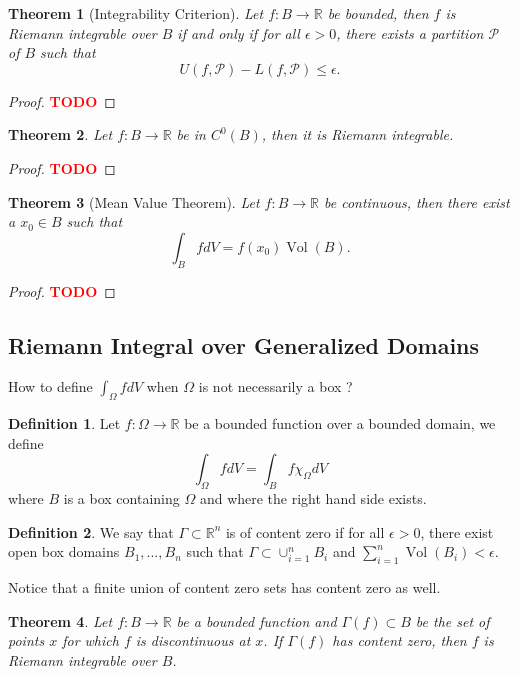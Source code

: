 \documentclass{article}
\theoremstyle{plain}
\newtheorem{theorem}{Theorem}[subsection]
\theoremstyle{definition}
\newtheorem*{definition}{Definition}
\newcommand{\R}{\mathbb{R}}
\renewcommand{\P}{\mathcal{P}}
\DeclareMathOperator{\Vol}{Vol}
\newcommand{\td}{\textcolor{red}{\textbf{TODO}}}
\begin{document}
\begin{theorem}[Integrability Criterion]
    Let $f : B \to \R$ be bounded, then $f$ is Riemann integrable over $B$ if and only if for all $\epsilon > 0$, there exists a partition $\P$ of $B$ such that
    $$U(f, \P) - L(f, \P) \leq \epsilon.$$
\end{theorem}

\begin{proof}
    \td 
\end{proof}

\begin{theorem}
    Let $f : B \to \R$ be in $C^0(B)$, then it is Riemann integrable.
\end{theorem}

\begin{proof}
    \td 
\end{proof}

\begin{theorem}[Mean Value Theorem]
    Let $f : B \to \R$ be continuous, then there exist a $x_0 \in B$ such that
    $$\int_B f dV = f(x_0) \Vol(B).$$
\end{theorem}

\begin{proof}
    \td 
\end{proof}

\subsection{Riemann Integral over Generalized Domains}

How to define $\int_{\Omega}fdV$ when $\Omega$ is not necessarily a box ?

\begin{definition}
    Let $f : \Omega \to \R$ be a bounded function over a bounded domain, we define
    $$\int_{\Omega} f dV = \int_{B} f \chi_{\Omega} dV$$
    where $B$ is a box containing $\Omega$ and where the right hand side exists.
\end{definition}

\begin{definition}
    We say that $\Gamma \subset \R^n$ is of content zero if for all $\epsilon > 0$, there exist open box domains $B_1, ..., B_n$ such that $\Gamma \subset \cup_{i=1}^nB_i$ and $\sum_{i=1}^{n} \Vol(B_i) < \epsilon$.
\end{definition}

Notice that a finite union of content zero sets has content zero as well.

\begin{theorem}
    Let $f : B \to \R$ be a bounded function and $\Gamma(f) \subset B$ be the set of points $x$ for which $f$ is discontinuous at $x$. If $\Gamma(f)$ has content zero, then $f$ is Riemann integrable over $B$.
\end{theorem}
\end{document}
